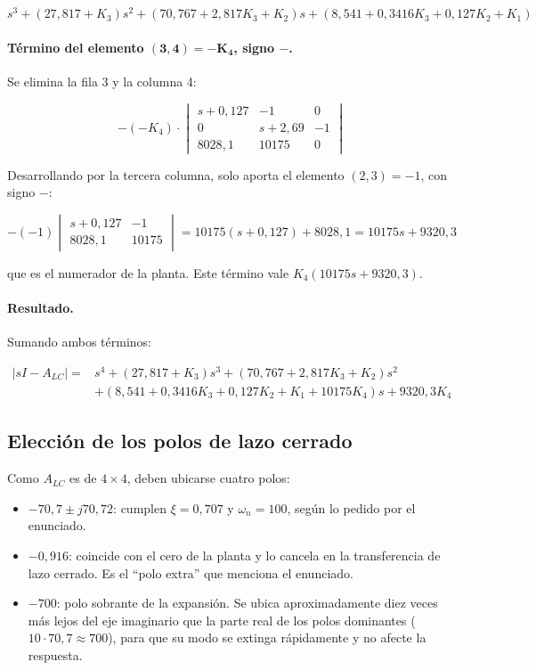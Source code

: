 \documentclass[12pt,a4paper]{article}
\begin{document}
\begin{equation}s^3+(27{,}817+K_3)s^2+(70{,}767+2{,}817K_3+K_2)s+(8{,}541+0{,}3416K_3+0{,}127K_2+K_1)\end{equation}
\paragraph{Término del elemento $\boldsymbol{(3,4)=-K_4}$, signo $-$.} Se elimina la fila 3 y la columna 4:

\begin{equation}-(-K_4)\cdot\begin{vmatrix}s+0{,}127&-1&0\\0&s+2{,}69&-1\\8028{,}1&10175&0\end{vmatrix}\end{equation}

Desarrollando por la tercera columna, solo aporta el elemento $(2,3)=-1$, con signo $-$:

\begin{equation}-(-1)\begin{vmatrix}s+0{,}127&-1\\8028{,}1&10175\end{vmatrix}=10175(s+0{,}127)+8028{,}1=10175s+9320{,}3\end{equation}

que es el numerador de la planta. Este término vale $K_4(10175s+9320{,}3)$.
\paragraph{Resultado.} Sumando ambos términos:

\begin{equation}\boxed{\begin{aligned}|sI-A_{LC}|={}&s^4+(27{,}817+K_3)s^3+(70{,}767+2{,}817K_3+K_2)s^2\\&+(8{,}541+0{,}3416K_3+0{,}127K_2+K_1+10175K_4)s+9320{,}3K_4\end{aligned}}\end{equation}
\subsection*{Elección de los polos de lazo cerrado}
Como $A_{LC}$ es de $4\times4$, deben ubicarse cuatro polos:

\begin{itemize}
\item $-70{,}7\pm j70{,}72$: cumplen $\xi=0{,}707$ y $\omega_n=100$, según lo pedido por el enunciado.
\item $-0{,}916$: coincide con el cero de la planta y lo cancela en la transferencia de lazo cerrado. Es el ``polo extra'' que menciona el enunciado.
\item $-700$: polo sobrante de la expansión. Se ubica aproximadamente diez veces más lejos del eje imaginario que la parte real de los polos dominantes ($10\cdot70{,}7\approx700$), para que su modo se extinga rápidamente y no afecte la respuesta.
\end{itemize}
\end{document}
